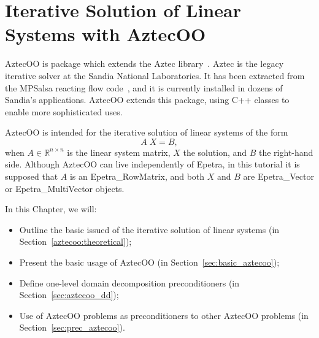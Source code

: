 % 
% 
% 
%  
%  
% 

\section{Iterative Solution of Linear Systems with AztecOO}
\label{chap:aztecoo}

AztecOO is package which extends the Aztec library~\cite{Aztec2.1}.
Aztec is the legacy iterative solver at the Sandia National
Laboratories.  It has been extracted from the MPSalsa reacting flow
code~\cite{MPSalsa-Theory,MPSalsa-User-Guide}, and it is currently
installed in dozens of Sandia's applications. AztecOO extends this
package, using C++ classes to enable more sophisticated uses.

AztecOO is intended for the iterative solution of linear systems of the
form
\begin{equation}
  \label{eq:linear_sys}
  A \; X = B ,
\end{equation}
when $A \in \mathbb{R}^{n \times n}$ is the linear system matrix, $X$
the solution, and $B$ the right-hand side. Although AztecOO can live
independently of Epetra, in this tutorial it is supposed that $A$ is an
Epetra\_RowMatrix, and both $X$ and $B$ are Epetra\_Vector or
Epetra\_MultiVector objects.

In this Chapter, we  will:
\begin{itemize}
\item Outline the basic issued of the iterative solution of linear
  systems (in Section~\ref{aztecoo:theoretical});
\item Present the basic usage of AztecOO (in
  Section~\ref{sec:basic_aztecoo});
\item Define one-level domain decomposition preconditioners (in
  Section~\ref{sec:aztecoo_dd});
\item Use of AztecOO problems as preconditioners to other AztecOO
  problems (in Section~\ref{sec:prec_aztecoo}).
\end{itemize}

